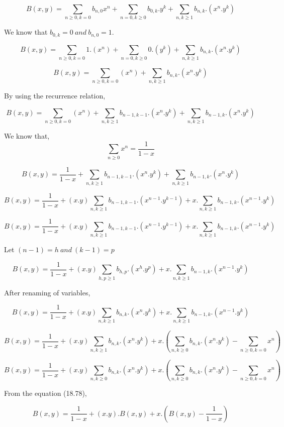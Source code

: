$$B(x,y) = \sum_{n \geq 0,k=0}b_{n,0}x^n + \sum_{n=0,k \geq 0}b_{0,k}.y^k + \sum_{n,k \geq 1}b_{n,k}.\left(x^n.y^k \right) $$

We know that $b_{0,k} = 0~and~b_{n,0}=1$.

$$B(x,y) = \sum_{n \geq 0,k=0}1. \left( x^n \right) + \sum_{n=0,k \geq 0}0. \left( y^k \right) + \sum_{n,k \geq 1}b_{n,k}.\left(x^n.y^k \right) $$

$$B(x,y) = \sum_{n \geq 0,k=0} \left( x^n \right) + \sum_{n,k \geq 1}b_{n,k}.\left(x^n.y^k \right)$$

By using the recurrence relation,

$$B(x,y) = \sum_{n \geq 0,k=0} \left( x^n \right) + \sum_{n,k \geq 1}b_{n-1,k-1}.\left(x^n.y^k \right) + \sum_{n,k \geq 1}b_{n-1,k}.\left(x^n.y^k \right)$$

We know that,
$$\sum_{n \geq 0}x^n = \frac{1}{1-x} $$

$$B(x,y) = \frac{1}{1-x} + \sum_{n,k \geq 1}b_{n-1,k-1}.\left(x^n.y^k \right) + \sum_{n,k \geq 1}b_{n-1,k}.\left(x^n.y^k \right)$$

$$B(x,y) = \frac{1}{1-x} + \left(x.y\right)\sum_{n,k \geq 1}b_{n-1,k-1}.\left(x^{n-1}.y^{k-1} \right) + x.\sum_{n,k \geq 1}b_{n-1,k}.\left(x^{n-1}.y^k \right)$$

$$B(x,y) = \frac{1}{1-x} + \left(x.y\right)\sum_{n,k \geq 1}b_{n-1,k-1}.\left(x^{n-1}.y^{k-1} \right) + x.\sum_{n,k \geq 1}b_{n-1,k}.\left(x^{n-1}.y^k \right)$$

Let $(n-1)=h~and~(k-1)=p$

$$B(x,y) = \frac{1}{1-x} + \left(x.y\right)\sum_{h,p \geq 1}b_{h,p}.\left(x^{h}.y^{p} \right) + x.\sum_{n,k \geq 1}b_{n-1,k}.\left(x^{n-1}.y^k \right)$$

After renaming of variables,

$$B(x,y) = \frac{1}{1-x} + \left(x.y\right)\sum_{n,k \geq 1}b_{n,k}.\left(x^{n}.y^{k} \right) + x.\sum_{n,k \geq 1}b_{n-1,k}.\left(x^{n-1}.y^k \right)$$

$$B(x,y) = \frac{1}{1-x} + \left(x.y\right)\sum_{n,k \geq 1}b_{n,k}.\left(x^{n}.y^{k} \right) + x.\left(\sum_{n,k \geq 0}b_{n,k}.\left(x^{n}.y^k \right) - \sum_{n \geq 0,k=0}x^n \right)$$

$$B(x,y) = \frac{1}{1-x} + \left(x.y\right)\sum_{n,k \geq 0}b_{n,k}.\left(x^{n}.y^{k} \right) + x.\left(\sum_{n,k \geq 0}b_{n,k}.\left(x^{n}.y^k \right) - \sum_{n \geq 0,k=0}x^n \right)$$

From the equation (18.78),

$$B(x,y) = \frac{1}{1-x} + \left(x.y\right).B(x,y) + x.\left(B(x,y) - \frac{1}{1-x} \right)$$

